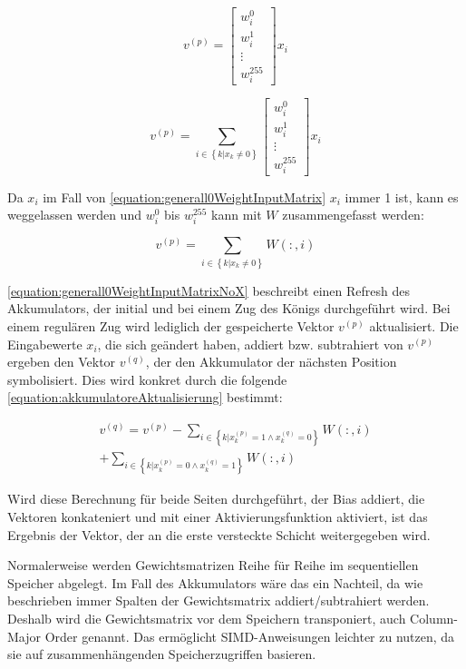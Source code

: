 \begin{equation}
  v^{(p)} = \begin{bmatrix}
    w_{i}^{0} \\
    w_{i}^{1} \\
    \vdots    \\
    w_{i}^{255}
  \end{bmatrix} x_{i}
  \label{equation:ithl0WeightInputMatrix}
\end{equation}

\begin{equation}
  v^{(p)} = \sum_{i\in\left \{  k|x_{k}\neq 0\right \}} \begin{bmatrix}
    w_{i}^{0} \\
    w_{i}^{1} \\
    \vdots    \\
    w_{i}^{255}
  \end{bmatrix} x_{i}
  \label{equation:generall0WeightInputMatrix}
\end{equation}

Da $x_{i}$ im Fall von \autoref{equation:generall0WeightInputMatrix} $x_{i}$ immer 1 ist, kann es weggelassen werden und $w_{i}^{0}$ bis $w_{i}^{255}$ kann mit $W$ zusammengefasst werden:

\begin{equation}
  v^{(p)} = \sum_{i\in\left \{  k|x_{k}\neq 0\right \}} W(:,i)
  \label{equation:generall0WeightInputMatrixNoX}
\end{equation}

\autoref{equation:generall0WeightInputMatrixNoX} beschreibt einen Refresh des Akkumulators, der initial und bei einem Zug des Königs durchgeführt wird. Bei einem regulären Zug wird lediglich der gespeicherte Vektor $v^{(p)}$ aktualisiert. Die Eingabewerte $x_{i}$, die sich geändert haben, addiert bzw. subtrahiert von $v^{(p)}$ ergeben den Vektor $v^{(q)}$, der den Akkumulator der nächsten Position symbolisiert. Dies wird konkret durch die folgende \autoref{equation:akkumulatoreAktualisierung} bestimmt:

\begin{equation}
  \begin{split}
    v^{(q)} = v^{(p)}
    - \sum_{i \in \left \{ k | x_{k}^{(p)}=1\wedge x_{k}^{(q)}=0 \right \}}^{} W(:,i) \\
    + \sum_{i \in \left \{ k | x_{k}^{(p)}=0\wedge x_{k}^{(q)}=1 \right \}}^{} W(:,i)
  \end{split}
  \label{equation:akkumulatoreAktualisierung}
\end{equation}

Wird diese Berechnung für beide Seiten durchgeführt, der Bias addiert, die Vektoren konkateniert und mit einer Aktivierungsfunktion aktiviert, ist das Ergebnis der Vektor, der an die erste versteckte Schicht weitergegeben wird.

Normalerweise werden Gewichtsmatrizen Reihe für Reihe im sequentiellen Speicher abgelegt. Im Fall des Akkumulators wäre das ein Nachteil, da wie beschrieben immer Spalten der Gewichtsmatrix addiert/subtrahiert werden. Deshalb wird die Gewichtsmatrix vor dem Speichern transponiert, auch Column-Major Order genannt. Das ermöglicht \ac{SIMD}-Anweisungen leichter zu nutzen, da sie auf zusammenhängenden Speicherzugriffen basieren.